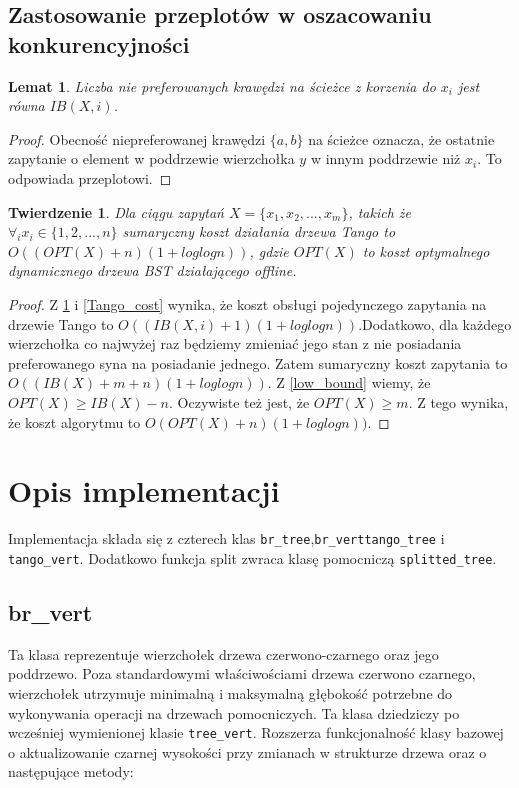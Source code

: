 \documentclass[declaration,shortabstract]{iithesis}
\newcounter{thm}[section]
\theoremstyle{thm}
\theoremstyle{remark}
\theoremstyle{plain}
\newtheorem{theorem}[thm]{Twierdzenie}
\theoremstyle{plain}
\theoremstyle{plain}
\newtheorem{lemma}[thm]{Lemat}
\begin{document}
\subsection{Zastosowanie przeplotów w oszacowaniu konkurencyjności} 
\begin{lemma}
\label{num_switch} 
Liczba nie preferowanych krawędzi na ścieżce z korzenia do \(x_i\) jest równa \(IB(X, i)\). 
\end{lemma} 
\begin{proof} 
Obecność niepreferowanej krawędzi \( \{a, b\}\) na ścieżce oznacza, że ostatnie zapytanie o element w poddrzewie wierzchołka $y$ w innym poddrzewie niż \(x_i\). To odpowiada przeplotowi. 
\end{proof}  

\begin{theorem} 
Dla ciągu zapytań \(X = \{x_1, x_2,..., x_m\}\), takich że \( \forall_i x_i \in \{1, 2, ..., n\}\) sumaryczny koszt działania drzewa Tango to \( O((OPT(X) + n)(1 + loglogn))\), gdzie \(OPT(X)\) to koszt optymalnego dynamicznego drzewa BST działającego offline. 
\end{theorem} 
\begin{proof} 
Z \ref{num_switch} i \ref{Tango_cost} wynika, że koszt obsługi pojedynczego zapytania na drzewie Tango to \(O((IB(X, i)+1)(1+loglogn))\).Dodatkowo, dla każdego wierzchołka co najwyżej raz będziemy zmieniać jego stan z nie posiadania preferowanego syna na posiadanie jednego. Zatem sumaryczny koszt zapytania to \(O((IB(X)+m +n )(1+loglogn))\). Z \ref{low_bound} wiemy, że \(OPT(X) \geq IB(X) - n\). Oczywiste też jest, że \(OPT(X) \geq m\). Z tego wynika, że koszt algorytmu to \(O(OPT(X)+n )(1+loglogn))\). 
\end{proof}  

\section{Opis implementacji} 

Implementacja składa się z czterech klas \texttt{br\_tree},\texttt{br\_vert}\texttt{tango\_tree} i \texttt{tango\_vert}. Dodatkowo funkcja split zwraca klasę pomocniczą  \texttt{splitted\_tree}.


\subsection{br\_vert}

Ta klasa reprezentuje wierzchołek drzewa czerwono-czarnego oraz jego poddrzewo. Poza standardowymi właściwościami drzewa czerwono czarnego, wierzchołek utrzymuje minimalną i maksymalną głębokość potrzebne do wykonywania operacji na drzewach pomocniczych. Ta klasa dziedziczy po wcześniej wymienionej klasie \texttt{tree\_vert}. Rozszerza funkcjonalność klasy bazowej o aktualizowanie czarnej wysokości przy zmianach w strukturze drzewa oraz o następujące metody:
\end{document}
